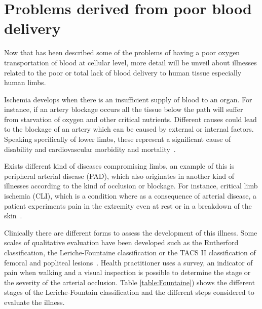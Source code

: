 \section{Problems derived from poor blood delivery} %
\label{section2.2}
Now that has been described some of the problems of having a poor oxygen transportation of blood at cellular level, more detail will be unveil about illnesses related to the poor or total lack of blood delivery to human tissue especially human limbs. 

Ischemia develops when there is an insufficient supply of blood to an organ. For instance, if an artery blockage occurs all the tissue below the path will suffer from starvation of oxygen and other critical nutrients. Different causes could lead to the blockage of an artery which can be caused by external or internal factors. Speaking specifically of lower limbs, these represent a significant cause of disability and cardiovascular morbidity and mortality~\cite{novo1995patients}. 

Exists different kind of diseases compromising limbs, an example of this is peripheral arterial disease (PAD), which also originates in another kind of illnesses according to the kind of occlusion or blockage. For instance, critical limb ischemia (CLI), which is a condition where as a consequence of arterial disease, a patient experiments pain in the extremity even at rest or in a breakdown of the skin~\cite{novo2004critical}. 

Clinically there are different forms to assess the development of this illness. Some scales of qualitative evaluation have been developed such as the Rutherford classification, the Leriche-Fountaine classification or the TACS II classification of femoral and popliteal lesions~\cite{norgren2007inter}. Health practitioner uses a survey, an indicator of pain when walking and a visual inspection is possible to determine the stage or the severity of the arterial occlusion.  Table \ref{table:Fountaine}) shows the different stages of the Leriche-Fountain classification and the different steps considered to evaluate the illness. 

